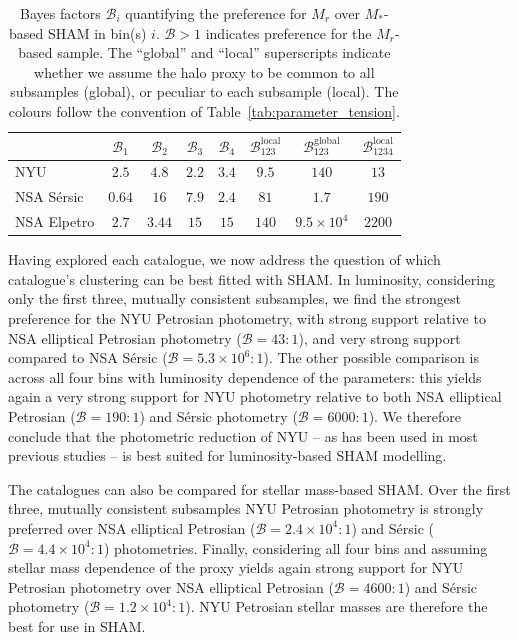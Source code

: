 \documentclass[usenatbib,useAMS]{mnras}
\newcommand{\pstrong}{\cellcolor[HTML]{B6DEB6}} %
\newcommand{\Pstrong}{\cellcolor[HTML]{4AAE4A}} %
\begin{document}
\begin{table}
\renewcommand{\arraystretch}{1.25}
\setlength{\tabcolsep}{5pt}
\begin{tabular}{lccccccc}
 &
  $\mathcal{B}_1$ &
  $\mathcal{B}_2$ &
  $\mathcal{B}_3$ &
  $\mathcal{B}_4$ &
  $\mathcal{B}_{123}^{\mathrm{local}}$ &
  $\mathcal{B}_{123}^{\mathrm{global}}$ &
  $\mathcal{B}_{1234}^{\mathrm{local}}$ \\ \hline
NYU         & $2.5$ & $4.8$  & $2.2$ & $3.4$ & $9.5$ & \pstrong $140$ & $13$ \\
% 
NSA S\'ersic  & $0.64$ & $16$ & $7.9$ & $2.4$ & \pstrong $81$   & $1.7$  & \Pstrong $190$    \\
% 
NSA Elpetro & $2.7$ & $3.44$  &  $15$ & $15$  & \pstrong $140$   & \Pstrong $9.5 \times 10^4$ & \Pstrong $2200$   \\
% 
\hline
\end{tabular}
\caption{\label{tab:Mr2M*_comparison} Bayes factors $\mathcal{B}_i$ quantifying the preference for $M_r$ over $M_*$-based \ac{SHAM} in bin(s) $i$. $\mathcal{B}>1$ indicates preference for the $M_r$-based sample. The ``global'' and ``local'' superscripts indicate whether we assume the halo proxy to be common to all subsamples (global), or peculiar to each subsample (local). The colours follow the convention of Table~\ref{tab:parameter_tension}.}
\end{table}

Having explored each catalogue, we now address the question of which catalogue's clustering can be best fitted with \ac{SHAM}. In luminosity, considering only the first three, mutually consistent subsamples, we find the strongest preference for the \ac{NYU} Petrosian photometry, with strong support relative to \ac{NSA} elliptical Petrosian photometry ($\mathcal{B} = 43 : 1$), and very strong support compared to \ac{NSA} S\'ersic ($\mathcal{B} = 5.3 \times 10^{6} : 1$). The other possible comparison is across all four bins with luminosity dependence of the parameters: this yields again a very strong support for \ac{NYU} photometry relative to both \ac{NSA} elliptical Petrosian ($\mathcal{B} = 190 : 1$) and S\'ersic photometry ($\mathcal{B} = 6000 : 1$). We therefore conclude that the photometric reduction of \ac{NYU} -- as has been used in most previous studies -- is best suited for luminosity-based \ac{SHAM} modelling.

The catalogues can also be compared for stellar mass-based \ac{SHAM}. Over the first three, mutually consistent subsamples \ac{NYU} Petrosian photometry is strongly preferred over \ac{NSA} elliptical Petrosian ($\mathcal{B} = 2.4 \times 10^4 : 1$) and S\'ersic ($\mathcal{B} = 4.4\times 10^{4} : 1$) photometries. Finally, considering all four bins and assuming stellar mass dependence of the proxy yields again strong support for \ac{NYU} Petrosian photometry over \ac{NSA} elliptical Petrosian ($\mathcal{B} = 4600 : 1$) and S\'ersic photometry ($\mathcal{B} = 1.2\times 10^4 : 1$). \ac{NYU} Petrosian stellar masses are therefore the best for use in \ac{SHAM}.
\end{document}
